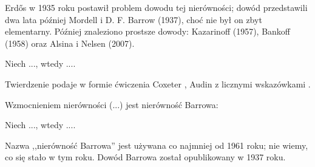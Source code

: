 %

\label{subsection_erdos_mordell}
Erdős w 1935 roku postawił problem dowodu tej nierówności; dowód przedstawili dwa lata później Mordell i D. F. Barrow (1937), choć nie był on zbyt elementarny. Później znaleziono prostsze dowody: Kazarinoff (1957), Bankoff (1958) oraz Alsina i Nelsen (2007).

\begin{theorem}
    Niech ..., wtedy ....
\end{theorem}

Twierdzenie podaje w formie ćwiczenia Coxeter \cite[s. 9]{coxeter_1991}, Audin z licznymi wskazówkami \cite[s. 102]{audin_2003}.


Wzmocnieniem nierówności (...) jest nierówność Barrowa:


\begin{theorem}
    Niech ..., wtedy ....
\end{theorem}

Nazwa ,,nierówność Barrowa'' jest używana co najmniej od 1961 roku; nie wiemy, co się stało w tym roku.
Dowód Barrowa został opublikowany w 1937 roku.

%